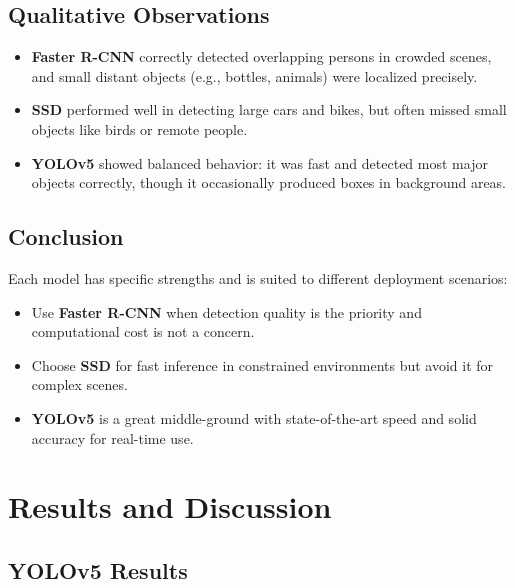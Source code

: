 \documentclass[12pt]{article}
\begin{document}
\subsection*{Qualitative Observations}

\begin{itemize}
    \item \textbf{Faster R-CNN} correctly detected overlapping persons in crowded scenes, and small distant objects (e.g., bottles, animals) were localized precisely.
    \item \textbf{SSD} performed well in detecting large cars and bikes, but often missed small objects like birds or remote people.
    \item \textbf{YOLOv5} showed balanced behavior: it was fast and detected most major objects correctly, though it occasionally produced boxes in background areas.
\end{itemize}

\subsection*{Conclusion}

Each model has specific strengths and is suited to different deployment scenarios:

\begin{itemize}
    \item Use \textbf{Faster R-CNN} when detection quality is the priority and computational cost is not a concern.
    \item Choose \textbf{SSD} for fast inference in constrained environments but avoid it for complex scenes.
    \item \textbf{YOLOv5} is a great middle-ground with state-of-the-art speed and solid accuracy for real-time use.
\end{itemize}
\section*{Results and Discussion}

\subsection*{YOLOv5 Results}
\end{document}
